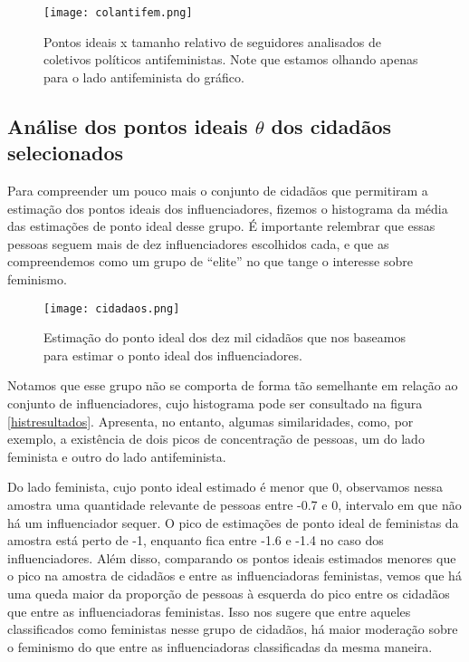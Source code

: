 \documentclass[
	12pt,				%
	openright,			%
	twoside,			%
	a4paper,			%
	english,			%
	brazil				%
	]{abntex2}
\begin{document}
 \begin{figure}[!htbp]
    \centering
    \texttt{[image: colantifem.png]}
    \caption{Pontos ideais x tamanho relativo de seguidores analisados de coletivos políticos antifeministas. Note que estamos olhando apenas para o lado antifeminista do gráfico.}
    \label{coletivosantifem}
 \end{figure}
 
 \clearpage 
 
 \subsection*{Análise dos pontos ideais $\theta$ dos cidadãos selecionados}
 Para compreender um pouco mais o conjunto de cidadãos que permitiram a estimação dos pontos ideais dos influenciadores, fizemos o histograma da média das estimações de ponto ideal desse grupo. É importante relembrar que essas pessoas seguem mais de dez influenciadores escolhidos cada, e que as compreendemos como um grupo de ``elite'' no que tange o interesse sobre feminismo.

 \begin{figure}[!htbp]
    \centering
    \texttt{[image: cidadaos.png]}
    \caption{Estimação do ponto ideal dos dez mil cidadãos que nos baseamos para estimar o ponto ideal dos influenciadores.}
    \label{cidadaosfasei}
 \end{figure}
 
 Notamos que esse grupo não se comporta de forma tão semelhante em relação ao conjunto de influenciadores, cujo histograma pode ser consultado na figura \ref{histresultados}. Apresenta, no entanto, algumas similaridades, como, por exemplo, a existência de dois picos de concentração de pessoas, um do lado feminista e outro do lado antifeminista.
 
 Do lado feminista, cujo ponto ideal estimado é menor que 0, observamos nessa amostra uma quantidade relevante de pessoas entre -0.7 e 0, intervalo em que não há um influenciador sequer. O pico de estimações de ponto ideal de feministas da amostra está perto de -1, enquanto fica entre -1.6 e -1.4 no caso dos influenciadores. Além disso, comparando os pontos ideais estimados menores que o pico na amostra de cidadãos e entre as influenciadoras feministas, vemos que há uma queda maior da proporção de pessoas à esquerda do pico entre os cidadãos que entre as influenciadoras feministas. Isso nos sugere que entre aqueles classificados como feministas nesse grupo de cidadãos, há maior moderação sobre o feminismo do que entre as influenciadoras classificadas da mesma maneira.
 
\end{document}
